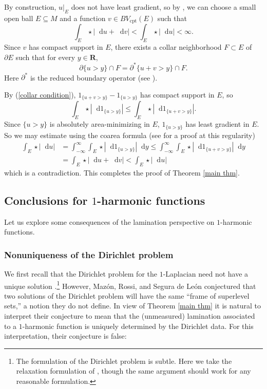 \documentclass[reqno,11pt]{amsart}
\newcommand{\RR}{\mathbf{R}}
\newcommand*\dif{\mathop{}\!\mathrm{d}}
\newcommand{\cpt}{\mathrm{cpt}}
\theoremstyle{definition}
\numberwithin{equation}{section}
\begin{document}
By construction, $u|_E$ does not have least gradient, so by \cite[Theorem 2.2]{Sternberg93}, we can choose a small open ball $E \subseteq M$ and a function $v \in BV_\cpt(E)$ such that
$$\int_E \star |\dif u + \dif v| < \int_E \star |\dif u| < \infty.$$
Since $v$ has compact support in $E$, there exists a collar neighborhood $F \subset E$ of $\partial E$ such that for every $y \in \RR$,
\begin{equation}\label{collar condition}
	\partial \{u > y\} \cap F = \partial^* \{u + v > y\} \cap F.
\end{equation}
Here $\partial^*$ is the reduced boundary operator (see \cite[Chapter 3]{Giusti77}).

By (\ref{collar condition}), $1_{\{u + v > y\}} - 1_{\{u > y\}}$ has compact support in $E$, so 
$$\int_E \star |\dif 1_{\{u > y\}}| \leq \int_E \star |\dif 1_{\{u + v > y\}}|.$$
Since $\{u > y\}$ is absolutely area-minimizing in $E$, $1_{\{u > y\}}$ has least gradient in $E$.
So we may estimate using the coarea formula (see \cite[Proposition 2.5]{BackusFLG} for a proof at this regularity)
\begin{align*}
\int_E \star |\dif u| &= \int_{-\infty}^\infty \int_E \star |\dif 1_{\{u > y\}}| \dif y \leq \int_{-\infty}^\infty \int_E \star |\dif 1_{\{u + v > y\}}| \dif y \\
&= \int_E \star |\dif u + \dif v| < \int_E \star |\dif u|
\end{align*}
which is a contradiction.
This completes the proof of Theorem \ref{main thm}.

\subsection{Conclusions for \texorpdfstring{$1$-harmonic}{one-harmonic} functions}\label{1harmonic apps}
Let us explore some consequences of the lamination perspective on $1$-harmonic functions.

\subsubsection{Nonuniqueness of the Dirichlet problem}
We first recall that the Dirichlet problem for the $1$-Laplacian need not have a unique solution \cite[Example 2.7]{Mazon14}.\footnote{The formulation of the Dirichlet problem is subtle. Here we take the relaxation formulation of \cite[Definition 2.3]{Mazon14}, though the same argument should work for any reasonable formulation.}
However, Maz\'on, Rossi, and Segura de Le\'on \cite[Remark 2.8]{Mazon14} conjectured that two solutions of the Dirichlet problem will have the same ``frame of superlevel sets,'' a notion they do not define.
In view of Theorem \ref{main thm} it is natural to interpret their conjecture to mean that the (unmeasured) lamination associated to a $1$-harmonic function is uniquely determined by the Dirichlet data.
For this interpretation, their conjecture is false:
\end{document}
